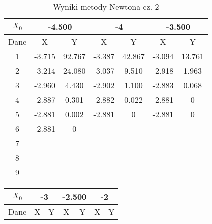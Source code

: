 \documentclass[a4paper, 11pt]{article}
\begin{document}
\begin{enumerate}
\begin{itemize}
\begin{table}[p]
\begin{tabular}{|c|c|c|c|c|c|c|}
\( X_0 \) & \multicolumn{2}{c|}{-4.500} & \multicolumn{2}{c|}{-4 } & \multicolumn{2}{c|}{-3.500} \\  
\hline                                                        
Dane & X & Y & X & Y & X & Y \\                              
\hline                                                        
1  & -3.715 & 92.767 & -3.387 & 42.867 & -3.094 & 13.761 \\
\hline                                                        
2  & -3.214 & 24.080 & -3.037 & 9.510 & -2.918 & 1.963 \\  
\hline                                                        
3  & -2.960 & 4.430 & -2.902 & 1.100 & -2.883 & 0.068 \\   
\hline                                                        
4  & -2.887 & 0.301 & -2.882 & 0.022 & -2.881 &  0\\   
\hline                                                        
5  & -2.881 & 0.002 & -2.881 & 0 & -2.881 &  0\\   
\hline                                                        
6  & -2.881 & 0 &  &  &  &  \\     
\hline                                                        
7  &  &  &  &  &  &  \\      
\hline                                                        
8  &  &  &  &  &  &  \\      
\hline                                                        
9  &  &  &  &  &  &  \\      
\hline                                                        
\end{tabular}                                                 
\caption{Wyniki metody Newtona cz. 2}                         
\label{table:Wyniki metody Newtona cz. 2}                     
\end{table}                                                   
\begin{table}[p]                                                
\centering                                                   
\begin{tabular}{|c|c|c|c|c|c|c|}                             
\hline                                                       
\( X_0 \) & \multicolumn{2}{c|}{-3  }&\multicolumn{2}{c|}{ -2.500}& \multicolumn{2}{c|}{-2  } \\ 
\hline                                                       
Dane & X & Y & X & Y & X & Y \\                             

\end{tabular}
\end{table}
\end{itemize}
\end{enumerate}
\end{document}
